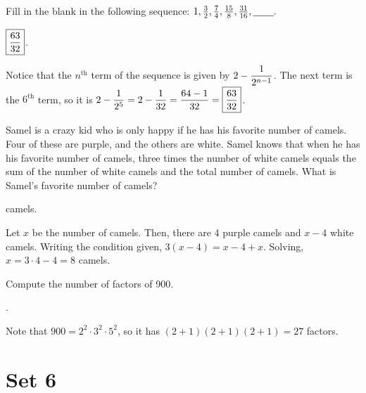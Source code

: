 \documentclass[11pt]{article}
\DeclareRobustCommand{\frac}[3][0pt]{%
  {\begingroup\hspace{#1}#2\hspace{#1}\endgroup\over\hspace{#1}#3\hspace{#1}}}
\begin{document}
\begin{problem}Fill in the blank in the following sequence: $1, \frac{3}{2}, \frac{7}{4}, \frac{15}{8}, \frac{31}{16}, \underline{\phantom{aaaa}}.$
\end{problem}

\begin{answer} $\boxed{\displaystyle \frac{63}{32}}$. \end{answer}
\begin{solution}
Notice that the $n^{\text{th}}$ term of the sequence is given by $\displaystyle 2 - \frac{1}{2^{n-1}}$. The next term is the $6^{\text{th}}$ term, so it is $\displaystyle 2 - \frac{1}{2^{5}} = 2 - \frac{1}{32} = \frac{64 - 1}{32} = \boxed{\frac{63}{32}}$.
\end{solution}

\begin{problem} Samel is a crazy kid who is only happy if he has his favorite number of camels. Four of these are purple, and the others are white. Samel knows that when he has his favorite number of camels, three times the number of white camels equals the sum of the number of white camels and the total number of camels. What is Samel's favorite number of camels?
\end{problem}

\begin{answer}  camels. \end{answer}
\begin{solution}
Let $x$ be the number of camels. Then, there are 4 purple camels and $x - 4$ white camels. Writing the condition given, $3(x - 4) = x - 4 + x$. Solving, $x = 3 \cdot 4 - 4 = \boxed{8}$ camels.
\end{solution}

\begin{problem} Compute the number of factors of 900.
\end{problem}

\begin{answer} . \end{answer}
\begin{solution}
Note that $900 = 2^2 \cdot 3^2 \cdot 5^2$, so it has $(2 + 1)(2 + 1)(2 + 1) = \boxed{27}$ factors.
\end{solution}

\eject

\section*{Set 6}
\end{document}
